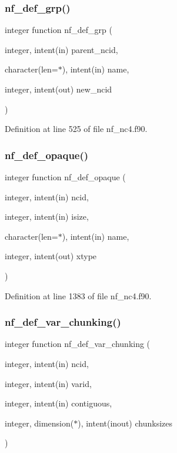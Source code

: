 \subsubsection{\texorpdfstring{nf\+\_\+def\+\_\+grp()}{nf\_def\_grp()}}
{\footnotesize\ttfamily integer function nf\+\_\+def\+\_\+grp (\begin{DoxyParamCaption}\item[{integer, intent(in)}]{parent\+\_\+ncid,  }\item[{character(len=$\ast$), intent(in)}]{name,  }\item[{integer, intent(out)}]{new\+\_\+ncid }\end{DoxyParamCaption})}



Definition at line 525 of file nf\+\_\+nc4.\+f90.

\mbox{\label{nf__nc4_8f90_ade841fe63e59aac378b8589dabbcd11e}} 
\subsubsection{\texorpdfstring{nf\+\_\+def\+\_\+opaque()}{nf\_def\_opaque()}}
{\footnotesize\ttfamily integer function nf\+\_\+def\+\_\+opaque (\begin{DoxyParamCaption}\item[{integer, intent(in)}]{ncid,  }\item[{integer, intent(in)}]{isize,  }\item[{character(len=$\ast$), intent(in)}]{name,  }\item[{integer, intent(out)}]{xtype }\end{DoxyParamCaption})}



Definition at line 1383 of file nf\+\_\+nc4.\+f90.

\mbox{\label{nf__nc4_8f90_a58c38d86fb28100f5c462eceafb54001}} 
\subsubsection{\texorpdfstring{nf\+\_\+def\+\_\+var\+\_\+chunking()}{nf\_def\_var\_chunking()}}
{\footnotesize\ttfamily integer function nf\+\_\+def\+\_\+var\+\_\+chunking (\begin{DoxyParamCaption}\item[{integer, intent(in)}]{ncid,  }\item[{integer, intent(in)}]{varid,  }\item[{integer, intent(in)}]{contiguous,  }\item[{integer, dimension($\ast$), intent(inout)}]{chunksizes }\end{DoxyParamCaption})}



